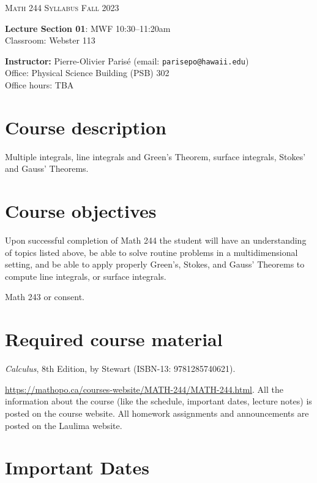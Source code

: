 \documentclass[12pt]{amsart}
\newcommand{\spacer}{\vspace{.2cm}}
\newcommand{\svs}{\vspace{.1cm}}
\begin{document}
\thispagestyle{empty}

\begin{center}
\textsc{Math 244} \hfill {\Large\textsc{Syllabus}} \hfill \textsc{Fall 2023}
\end{center}

\noindent\hrulefill

\noindent \textbf{Lecture Section 01}: MWF 10:30--11:20am \\
Classroom: Webster 113

\spacer

\noindent\textbf{Instructor:} Pierre-Olivier Paris{\'e} (email: \texttt{parisepo@hawaii.edu})\\
Office: Physical Science Building (PSB) 302\\
Office hours: TBA

\noindent\hrulefill

\section*{Course description}
Multiple integrals, line integrals and Green's Theorem, surface integrals, Stokes' and Gauss' Theorems. \svs

\section*{Course objectives}
Upon successful completion of Math 244 the student will have an understanding of topics listed above, be able to solve routine problems in a multidimensional setting, and be able to apply properly Green's, Stokes, and Gauss' Theorems to compute line integrals, or surface integrals.

Math 243 or consent.

\section*{Required course material}

 \emph{Calculus}, 8th Edition, by Stewart (ISBN-13: 9781285740621). 

 \url{https://mathopo.ca/courses-website/MATH-244/MATH-244.html}. All the information about the course (like the schedule, important dates, lecture notes) is posted on the course website. All homework assignments and announcements are posted on the Laulima website.

\section*{Important Dates}
\end{document}
